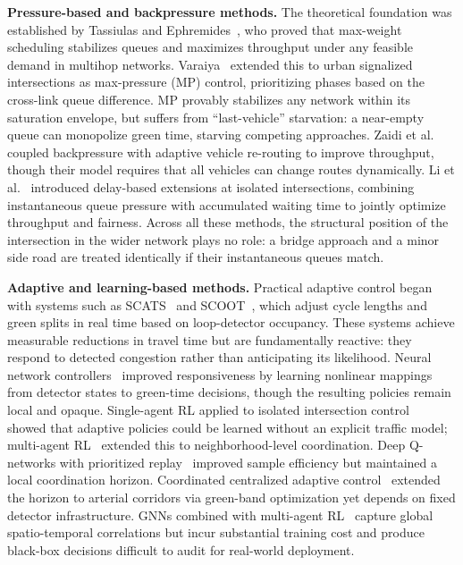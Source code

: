 \documentclass[letterpaper, conference]{IEEEtran}
\begin{document}
\textbf{Pressure-based and backpressure methods.}
The theoretical foundation was established by Tassiulas and Ephremides~\cite{tassiulas1992stability}, who proved that max-weight scheduling stabilizes queues and maximizes throughput under any feasible demand in multihop networks. Varaiya~\cite{varaiya2013maxpressure} extended this to urban signalized intersections as max-pressure (MP) control, prioritizing phases based on the cross-link queue difference. MP provably stabilizes any network within its saturation envelope, but suffers from ``last-vehicle'' starvation: a near-empty queue can monopolize green time, starving competing approaches. Zaidi et al.~\cite{zaidi2016backpressure} coupled backpressure with adaptive vehicle re-routing to improve throughput, though their model requires that all vehicles can change routes dynamically. Li et al.~\cite{li2018delay} introduced delay-based extensions at isolated intersections, combining instantaneous queue pressure with accumulated waiting time to jointly optimize throughput and fairness. Across all these methods, the structural position of the intersection in the wider network plays no role: a bridge approach and a minor side road are treated identically if their instantaneous queues match.

\textbf{Adaptive and learning-based methods.}
Practical adaptive control began with systems such as SCATS~\cite{lowrie1982scats} and SCOOT~\cite{gartner2005state}, which adjust cycle lengths and green splits in real time based on loop-detector occupancy. These systems achieve measurable reductions in travel time but are fundamentally reactive: they respond to detected congestion rather than anticipating its likelihood. Neural network controllers~\cite{srinivasan2008network} improved responsiveness by learning nonlinear mappings from detector states to green-time decisions, though the resulting policies remain local and opaque. Single-agent RL applied to isolated intersection control~\cite{abdulhai2003reinforcement} showed that adaptive policies could be learned without an explicit traffic model; multi-agent RL~\cite{wiering2000multi} extended this to neighborhood-level coordination. Deep Q-networks with prioritized replay~\cite{liang2020contextual} improved sample efficiency but maintained a local coordination horizon. Coordinated centralized adaptive control~\cite{gartner2005state} extended the horizon to arterial corridors via green-band optimization yet depends on fixed detector infrastructure. GNNs combined with multi-agent RL~\cite{zhang2021trafficgcn} capture global spatio-temporal correlations but incur substantial training cost and produce black-box decisions difficult to audit for real-world deployment.
\end{document}
